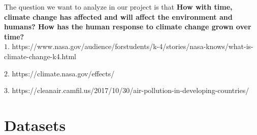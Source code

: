 \documentclass[a4paper, 11pt]{report}
\begin{document}
  { The question we want to analyze in our project is that \textbf{How with time, climate change has affected and will affect the environment and humans? How has the human response to climate change grown over time?} }\\

    \scriptsize{$1$. https://www.nasa.gov/audience/forstudents/k-4/stories/nasa-knows/what-is-climate-change-k4.html}

    \scriptsize{$2$. https://climate.nasa.gov/effects/}

    \scriptsize{$3$. https://cleanair.camfil.us/2017/10/30/air-pollution-in-developing-countries/}\normalsize

\newpage

\chapter{Datasets}
\end{document}
